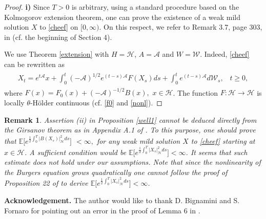 \documentclass[preprint]{imsart}
\newtheorem{remark}[theorem]{Remark}
\def\E{\mathbb E}
\def\A{\mathcal A}
\def\H{\mathcal  H}
\def\W{\mathcal  W}
\begin{document}
\begin{proof} {\bf i)}
 Since $T>0$ is arbitrary, using   a standard procedure based on the Kolmogorov extension theorem, one can prove the existence of a weak mild solution $X$ to \eqref{cheef} on  $[0, \infty)$. On this respect, we refer to  Remark 3.7, page 303, in \cite{KS} (cf. the beginning of Section 4). 
 
 
 \vskip 2mm 
  We use Theorem \ref{extension} with $H = \H$, $A = \A$ and $W = \W$. 
 Indeed,  \eqref{cheef} can be rewritten as
 \begin{gather*}
 \label{chee}
 \begin{array}{l}
X_t = e^{t \A }x +\int_{0}^{t}(- \A)^{1/2}e^{(  t-s)  \A}F  (
X_{s})ds
 +
\int_{0}^{t}e^{(  t-s)  \A}d \W_{s}, \;\;\; t \ge 0,
\end{array}
\end{gather*}
 where
 $
 F(x) = F_0(x) + (-\A )^{-1/2} B(x),$ $x \in \H
 $. The function $F : \H \to \H$ is locally $\theta$-H\"older continuous  (cf. \eqref{f0} and \eqref{nonl}). 
\end{proof}
 
 
  
\begin{remark} \label{che} {\rm 
Assertion (ii) in Proposition \ref{well1} cannot be deduced directly 
from  the Girsanov theorem
as in Appendix A.1 of \cite{DFPR}. To this purpose,
 one should prove that 
 $\E \Big [ e^{\frac{1}{2} \int_0^T  |B(X_s)  |_{{\mathcal H}}^2 ds}\Big]$ $  < \infty, $
for any weak mild solution $X$  to \eqref{cheef} starting at  $x \in \H$.  A sufficient condition would be   $\E \Big [ e^{\frac{1}{2} \int_0^T  |X_s  |_{{\mathcal H}}^2 ds}\Big] < \infty$. 
  It seems that such estimate does not hold under our assumptions. 
Note that since the nonlinearity of the Burgers equation grows quadratically 
 one cannot follow the proof of Proposition 22  of \cite{DFPR} to derive %
  $\E \Big [ e^{\frac{1}{2} \int_0^T  |X_s  |_{{\mathcal H}}^2 ds}\Big] < \infty$.
 }
  \end{remark}
  

 

 
 \noindent \textbf{Acknowledgement.}
The author would like to thank D. Bignamini and S. Fornaro  for pointing
out an error in the proof of    Lemma 6 in  \cite{priolaAOP}. 
\end{document}
